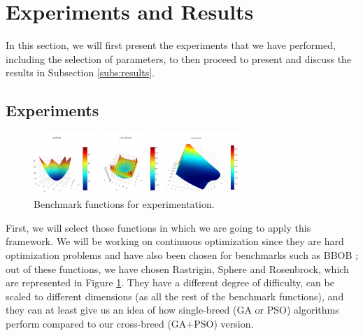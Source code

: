 \documentclass[runningheads]{llncs}
\begin{document}


  \section{Experiments and Results}
  \label{sec:exp}

  In this section, we will first present the experiments that we have performed,
  including the selection of parameters, to then proceed to present and discuss
  the results in Subsection \ref{subs:results}. 
    
  \subsection{Experiments}

\begin{figure}[htp] \centering
\includegraphics[width=0.7\textwidth]{img/benchmark.png} 
\caption{Benchmark
functions for experimentation.} 
\label{fig:functions} 
\end{figure} %

First, we will select those functions in which we are going to apply this framework. We
will be working on continuous optimization since they are hard optimization
problems and have also been chosen for benchmarks such as BBOB
\cite{hansen2010bbob}; out of these functions, we have chosen Rastrigin, Sphere
and Rosenbrock, which are represented in Figure \ref{fig:functions}. They have a
different degree of difficulty, can be scaled to different dimensions (as all
the rest of the benchmark functions), and they can at least give us an idea of
how single-breed (GA or PSO) algorithms perform compared to our cross-breed
(GA+PSO) version.  
\end{document}
